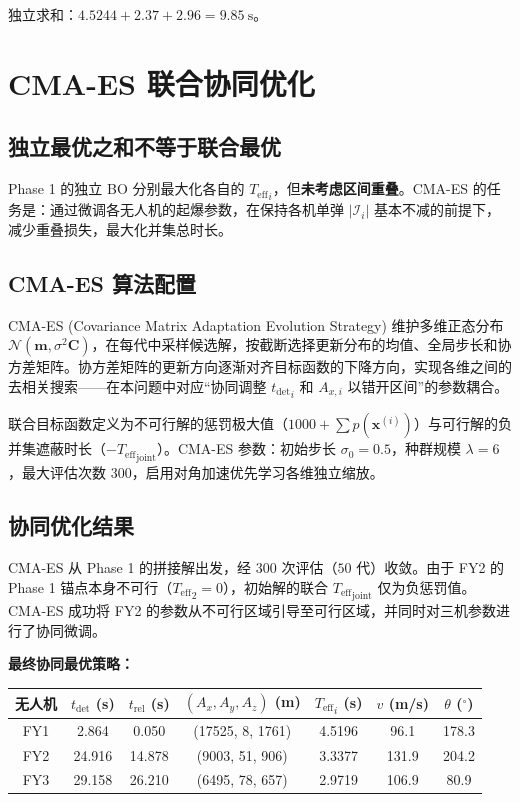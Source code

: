 \documentclass[12pt,a4paper]{ctexart}
\newcommand{\tdet}{t_{\text{det}}}
\newcommand{\Teff}{T_{\text{eff}}}
\newcommand{\N}{\mathcal{N}}
\begin{document}
独立求和：$4.5244 + 2.37 + 2.96 = 9.85\ \mathrm{s}$。

\section{CMA-ES 联合协同优化}
\label{sec:p4-cma}

\subsection{独立最优之和不等于联合最优}

Phase 1 的独立 BO 分别最大化各自的 ${\Teff}_i$，但\textbf{未考虑区间重叠}。CMA-ES 的任务是：通过微调各无人机的起爆参数，在保持各机单弹 $|\mathcal{I}_i|$ 基本不减的前提下，减少重叠损失，最大化并集总时长。

\subsection{CMA-ES 算法配置}

CMA-ES (Covariance Matrix Adaptation Evolution Strategy) 维护多维正态分布 $\N(\mathbf{m}, \sigma^2 \mathbf{C})$，在每代中采样候选解，按截断选择更新分布的均值、全局步长和协方差矩阵。协方差矩阵的更新方向逐渐对齐目标函数的下降方向，实现各维之间的去相关搜索——在本问题中对应``协同调整 ${\tdet}_i$ 和 $A_{x,i}$ 以错开区间''的参数耦合。

联合目标函数定义为不可行解的惩罚极大值（$1000 + \sum p(\mathbf{x}^{(i)})$）与可行解的负并集遮蔽时长（$-{\Teff}_{\text{joint}}$）。CMA-ES 参数：初始步长 $\sigma_0 = 0.5$，种群规模 $\lambda = 6$，最大评估次数 $300$，启用对角加速优先学习各维独立缩放。

\subsection{协同优化结果}

CMA-ES 从 Phase 1 的拼接解出发，经 $300$ 次评估（$50$ 代）收敛。由于 FY2 的 Phase 1 锚点本身不可行（${\Teff}_2 = 0$），初始解的联合 ${\Teff}_{\text{joint}}$ 仅为负惩罚值。CMA-ES 成功将 FY2 的参数从不可行区域引导至可行区域，并同时对三机参数进行了协同微调。

\textbf{最终协同最优策略：}

\begin{center}
\begin{tabular}{c|c|c|c|c|c|c}
\toprule
\textbf{无人机} & $\tdet$ (s) & $t_{\text{rel}}$ (s) & $(A_x, A_y, A_z)$ (m) & ${\Teff}_i$ (s) & $v$ (m/s) & $\theta$ ($^\circ$) \\
\midrule
FY1 & 2.864 & 0.050  & (17525, 8, 1761) & 4.5196 & 96.1 & 178.3 \\
FY2 & 24.916 & 14.878 & (9003, 51, 906)  & 3.3377 & 131.9 & 204.2 \\
FY3 & 29.158 & 26.210 & (6495, 78, 657)  & 2.9719 & 106.9 & 80.9 \\
\bottomrule
\end{tabular}
\end{center}
\end{document}
